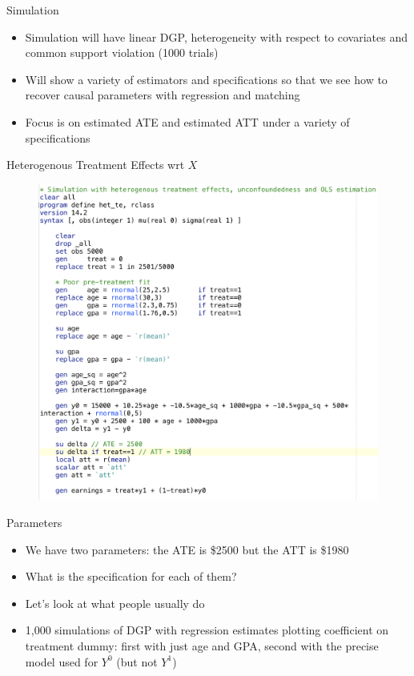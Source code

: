 \documentclass{beamer}
\begin{document}
\begin{frame}{Simulation}

\begin{itemize}

\item Simulation will have linear DGP, heterogeneity with respect to covariates and common support violation (1000 trials)
\item Will show a variety of estimators and specifications so that we see how to recover causal parameters with regression and matching
\item Focus is on estimated ATE and estimated ATT under a variety of specifications
\end{itemize}

\end{frame}

\begin{frame}{Heterogenous Treatment Effects wrt $X$}

\begin{figure}[!t]\centering
\includegraphics[scale=0.27]{./lecture_includes/stata_matching_code}
\end{figure}

\end{frame}

\begin{frame}{Parameters}

\begin{itemize}

\item We have two parameters: the ATE is \$2500 but the ATT is \$1980
\item What is the specification for each of them?
\item Let's look at what people usually do
\item 1,000 simulations of DGP with regression estimates plotting coefficient on treatment dummy: first with just age and GPA, second with the precise model used for $Y^0$ (but not $Y^1$)

\end{itemize}

\end{frame}
\end{document}
